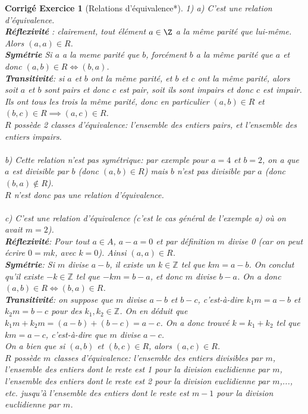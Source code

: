\documentclass[11pt,french,table]{article}
\theoremstyle{exercice}
\theoremstyle{corrigé}
\newtheorem{corrigé}{Corrigé Exercice}
\begin{document}
\begin{corrigé}[Relations d'équivalence*]
1)
    a) C'est une relation d'équivalence. \\
    \textbf{Réflexivité} : clairement, tout élément $a \in \Z$ a la même parité que lui-même. Alors $(a,a)\in R$.\\
    \textbf{Symétrie} Si $a$ a la meme parité que $b$, forcément $b$ a la même parité que $a$ et donc $(a,b) \in R \iff (b,a)$.\\
    \textbf{Transitivité}: si $a$ et $b$ ont la même parité, et $b$ et $c$ ont la même parité, alors soit $a$ et $b$ sont pairs et donc $c$ est pair, soit ils sont impairs et donc $c$ est impair. Ils ont tous les trois la même parité, donc en particulier $(a,b) \in R$ et $(b,c) \in R \implies (a,c) \in R$. \\
    $R$ possède 2 classes d'équivalence: l'ensemble des entiers pairs, et l'ensemble des entiers impairs. \\
    \\
    b) Cette relation n'est pas symétrique: par exemple pour $a=4$ et $b=2$, on a que $a$ est divisible par $b$ (donc $(a,b) \in R$) mais $b$ n'est pas divisible par $a$ (donc $(b,a) \notin R$). \\
    $R$ n'est donc pas une relation d'équivalence. \\ \\
    c) C'est une relation d'équivalence (c'est le cas général de l'exemple a) où on avait $m = 2$). \\
    \textbf{Réflexivité}: Pour tout $a \in A$, $a-a = 0$ et par définition $m$ divise 0 (car on peut écrire $0=mk$, avec $k=0$). Ainsi $(a,a) \in R$. \\
    \textbf{Symétrie}: Si $m$ divise $a-b$, il existe un $k \in \mathbb{Z}$ tel que $km=a-b$. On conclut qu'il existe $-k \in \mathbb{Z}$ tel que $-km=b-a$, et donc $m$ divise $b-a$. On a donc $(a,b) \in R \iff (b,a) \in R$. \\
    \textbf{Transitivité}: on suppose que $m$ divise $a-b$ et $b-c$, c'est-à-dire $k_1m=a-b$ et $k_2m=b-c$ pour des $k_1,k_2 \in \mathbb{Z}$. On en déduit que $k_1m+k_2m= (a-b)+(b-c)=a-c$. On a donc trouvé $k=k_1+k_2$ tel que $km=a-c$, c'est-à-dire que $m$ divise $a-c$. \\
    On a bien que si $(a,b)$ et $(b,c) \in R$, alors $(a,c) \in R$. \\
    $R$ possède $m$ classes d'équivalence: l'ensemble des entiers divisibles par $m$, l'ensemble des entiers dont le reste est 1 pour la division euclidienne par $m$, l'ensemble des entiers dont le reste est 2 pour la division euclidienne par $m$,..., etc. jusqu'à l'ensemble des entiers dont le reste est $m-1$ pour la division euclidienne par $m$.

\end{corrigé}
\end{document}
